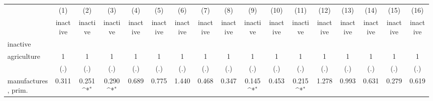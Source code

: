 {
\def\sym#1{\ifmmode^{#1}\else\(^{#1}\)\fi}
\begin{tabular}{l*{16}{c}}
\hline\hline
                    &\multicolumn{1}{c}{(1)}&\multicolumn{1}{c}{(2)}&\multicolumn{1}{c}{(3)}&\multicolumn{1}{c}{(4)}&\multicolumn{1}{c}{(5)}&\multicolumn{1}{c}{(6)}&\multicolumn{1}{c}{(7)}&\multicolumn{1}{c}{(8)}&\multicolumn{1}{c}{(9)}&\multicolumn{1}{c}{(10)}&\multicolumn{1}{c}{(11)}&\multicolumn{1}{c}{(12)}&\multicolumn{1}{c}{(13)}&\multicolumn{1}{c}{(14)}&\multicolumn{1}{c}{(15)}&\multicolumn{1}{c}{(16)}\\
                    &\multicolumn{1}{c}{inactive}&\multicolumn{1}{c}{inactive}&\multicolumn{1}{c}{inactive}&\multicolumn{1}{c}{inactive}&\multicolumn{1}{c}{inactive}&\multicolumn{1}{c}{inactive}&\multicolumn{1}{c}{inactive}&\multicolumn{1}{c}{inactive}&\multicolumn{1}{c}{inactive}&\multicolumn{1}{c}{inactive}&\multicolumn{1}{c}{inactive}&\multicolumn{1}{c}{inactive}&\multicolumn{1}{c}{inactive}&\multicolumn{1}{c}{inactive}&\multicolumn{1}{c}{inactive}&\multicolumn{1}{c}{inactive}\\
\hline
inactive            &                     &                     &                     &                     &                     &                     &                     &                     &                     &                     &                     &                     &                     &                     &                     &                     \\
agriculture         &           1         &           1         &           1         &           1         &           1         &           1         &           1         &           1         &           1         &           1         &           1         &           1         &           1         &           1         &           1         &           1         \\
                    &         (.)         &         (.)         &         (.)         &         (.)         &         (.)         &         (.)         &         (.)         &         (.)         &         (.)         &         (.)         &         (.)         &         (.)         &         (.)         &         (.)         &         (.)         &         (.)         \\
[1em]
manufactures, prim. &       0.311         &       0.251\sym{*}  &       0.290\sym{*}  &       0.689         &       0.775         &       1.440         &       0.468         &       0.347         &       0.145\sym{*}  &       0.453         &       0.215\sym{*}  &       1.278         &       0.993         &       0.631         &       0.279         &       0.619         \\

\end{tabular}}
